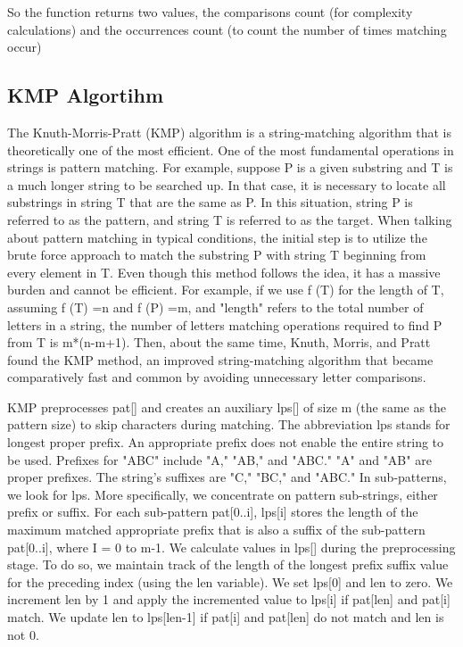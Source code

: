 \documentclass{article}
\theoremstyle{plain}
\begin{document}
So the function returns two values, the comparisons count (for complexity calculations) and the occurrences count (to count the number of times matching occur)
\newpage
\subsection*{KMP Algortihm}
The Knuth-Morris-Pratt (KMP) algorithm is a string-matching algorithm that is theoretically one of the most efficient. One of the most fundamental operations in strings is pattern matching.
For example, suppose P is a given substring and T is a much longer string to be searched up. In that case, it is necessary to locate all substrings in string T that are the same as P. In this situation, string P is referred to as the pattern, and string T is referred to as the target. When talking about pattern matching in typical conditions, the initial step is to utilize the brute force approach to match the substring P with string T beginning from every element in T. Even though this method follows the idea, it has a massive burden and cannot be efficient. For example, if we use f (T) for the length of T, assuming f (T) =n and f (P) =m, and "length" refers to the total number of letters in a string, the number of letters matching operations required to find P from T is m*(n-m+1). Then, about the same time, Knuth, Morris, and Pratt found the KMP method, an improved string-matching algorithm that became comparatively fast and common by avoiding unnecessary letter comparisons.

KMP preprocesses pat[] and creates an auxiliary lps[] of size m (the same as the pattern size) to skip characters during matching. The abbreviation lps stands for longest proper prefix. An appropriate prefix does not enable the entire string to be used. Prefixes for "ABC" include "A," "AB," and "ABC."
"A" and "AB" are proper prefixes. The string's suffixes are "C," "BC," and "ABC." In sub-patterns, we look for lps. More specifically, we concentrate on pattern sub-strings, either prefix or suffix. For each sub-pattern pat[0..i], lps[i] stores the length of the maximum matched appropriate prefix that is also a suffix of the sub-pattern pat[0..i], where I = 0 to m-1.
We calculate values in lps[] during the preprocessing stage. To do so, we maintain track of the length of the longest prefix suffix value for the preceding index (using the len variable). We set lps[0] and len to zero. We increment len by 1 and apply the incremented value to lps[i] if pat[len] and pat[i] match. We update len to lps[len-1] if pat[i] and pat[len] do not match and len is not 0.\\
\end{document}
